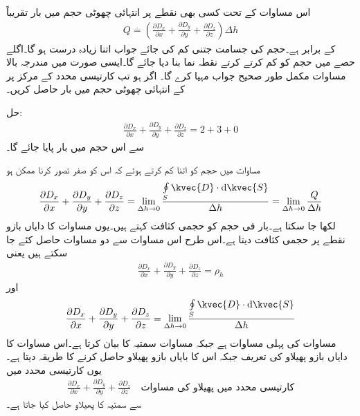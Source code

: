 اس مساوات کے تحت کسی بھی نقطے پر انتہائی چھوٹی حجم  میں بار تقریباً
\begin{align}
Q\overset{.}{=} \left( \frac{\partial D_x}{\partial x}+\frac{\partial D_y}{\partial y}+\frac{\partial D_z}{\partial z} \right)\Delta h
\end{align}
کے برابر ہے۔حجم کی جسامت جتنی کم کی جائے جواب اتنا زیادہ درست ہو گا۔اگلے حصے میں حجم کو کم کرتے کرتے نقطہ نما بنا دیا جائے گا۔ایسی صورت میں مندرجہ بالا مساوات مکمل طور صحیح جواب مہیا کرے گا۔
اگر  ہو تب کارتیسی محدد کے مرکز پر  کے انتہائی چھوٹی حجم میں بار حاصل کریں۔

حل:
\begin{align*}
\frac{\partial D_x}{\partial x}+\frac{\partial D_y}{\partial y}+\frac{\partial D_z}{\partial z} =2+3+0
\end{align*}
سے اس حجم میں  بار  پایا جائے گا۔

مساوات  میں حجم  کو اتنا کم کرتے ہوئے کہ اس کو صفر تصور کرنا ممکن ہو
\begin{align*}
\frac{\partial D_x}{\partial x}+\frac{\partial D_y}{\partial y}+\frac{\partial D_z}{\partial z}=\lim_{\Delta h \to 0}\frac{\oint\limits_{S}\kvec{D}\cdot \dif \kvec{S}}{\Delta h}=\lim_{\Delta h \to 0} \frac{Q}{\Delta h}
\end{align*}
لکھا جا سکتا ہے۔بار فی حجم کو حجمی کثافت کہتے ہیں۔یوں مساوات کا دایاں بازو نقطے پر حجمی کثافت  دیتا ہے۔اس طرح اس مساوات سے دو مساوات حاصل کئے جا سکتے ہیں یعنی
\begin{align}\label{مساوات_گاوس_میکسویل_پھیلاو_مساوات}
\frac{\partial D_x}{\partial x}+\frac{\partial D_y}{\partial y}+\frac{\partial D_z}{\partial z}=\rho_h
\end{align}
اور 
\begin{align}\label{مساوات_گاوس_پھیلاو_کی_تعریف}
\frac{\partial D_x}{\partial x}+\frac{\partial D_y}{\partial y}+\frac{\partial D_z}{\partial z}=\lim_{\Delta h \to 0}\frac{\oint\limits_{S}\kvec{D}\cdot \dif \kvec{S}}{\Delta h}
\end{align}
مساوات   کی پہلی مساوات ہے جبکہ مساوات  سمتیہ  کا  بیان کرتا ہے۔اس مساوات کا دایاں بازو پھیلاو کی تعریف جبکہ اس کا بایاں بازو پھیلاو حاصل کرنے کا طریقہ دیتا ہے۔یوں کارتیسی محدد میں 
\begin{align}\label{مساوات_گاوس_کارتیسی_محدد_پھیلاو_کی_مساوات}
\frac{\partial D_x}{\partial x}+\frac{\partial D_y}{\partial y}+\frac{\partial D_z}{\partial z} \quad \textrm{کارتیسی محدد میں پھیلاو کی مساوات}
\end{align}
سے سمتیہ  کا پھیلاو حاصل کیا جاتا ہے۔

